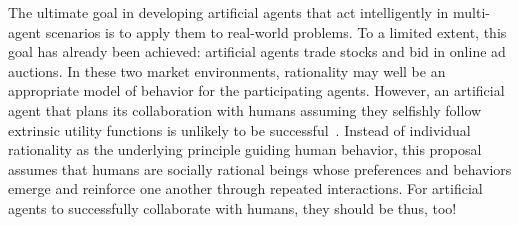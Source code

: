 The ultimate goal in developing artificial agents that act
intelligently in multi-agent scenarios is to apply them to real-world
problems.  To a limited extent, this goal has already been achieved:
artificial agents trade stocks and bid in online ad auctions.  In
these two market environments, rationality may well be an appropriate
model of behavior for the participating agents.  However,
an artificial agent that plans its collaboration with humans assuming
they selfishly follow extrinsic utility functions is unlikely to be
successful~\cite{Camerer:2003,gal04,kahnemanst82}.  Instead of
individual rationality as the underlying principle guiding human
behavior, this proposal assumes that humans are socially rational
beings whose preferences and behaviors emerge and reinforce one
another through repeated interactions.  For artificial agents to
successfully collaborate with humans, they should be thus, too!

